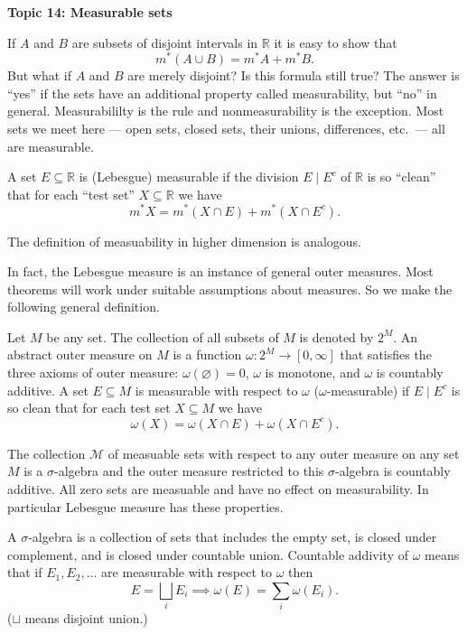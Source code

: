 \documentclass[11pt]{article}
\begin{document}
\begin{center}
  \textbf{Topic 14: Measurable sets}
\end{center}

If $A$ and $B$ are subsets of disjoint intervals in $\mathbb{R}$ it is easy to show that
\[
  m^*(A\cup B) = m^*A + m^*B.
\]
But what if $A$ and $B$ are merely disjoint?  Is this formula still true?  The answer is ``yes'' if the sets have an additional property called measurability, but ``no'' in general.  Measurabililty is the rule and nonmeasurability is the exception.  Most sets we meet here --- open sets, closed sets, their unions, differences, etc.\ --- all are measurable.

\begin{defn}
  A set $E \subseteq \mathbb{R}$ is \textsf{(Lebesgue) measurable} if the division $E \mid E^c$ of $\mathbb{R}$ is so ``clean'' that for each ``test set'' $X \subseteq \mathbb{R}$ we have
  \[
    m^*X = m^*(X \cap E) + m^*(X \cap E^c).
  \]

  The definition of measuability in higher dimension is analogous.
\end{defn}

In fact, the Lebesgue measure is an instance of general outer measures.  Most theorems will work under suitable assumptions about measures.  So we make the following general definition.

\begin{defn}
  Let $M$ be any set.  The collection of all subsets of $M$ is denoted by $2^M$.  An \textsf{abstract outer measure} on $M$ is a function $\omega : 2^M \to [0,\infty]$ that satisfies the three axioms of outer measure: $\omega(\varnothing) = 0$, $\omega$ is monotone, and $\omega$ is countably additive.  A set $E \subseteq M$ is \textsf{measurable} with respect to $\omega$ ($\omega$-measurable) if $E \mid E^c$ is so clean that for each test set $X \subseteq M$ we have
  \[
    \omega(X) = \omega(X \cap E) + \omega(X \cap E^c).
  \]
\end{defn}

\begin{thm}
  The collection $\mathcal{M}$ of measuable sets with respect to any outer measure on any set $M$ is a $\sigma$-algebra and the outer measure restricted to this $\sigma$-algebra is countably additive.  All zero sets are measuable and have no effect on measurability.  In particular Lebesgue measure has these properties.
\end{thm}

A \textsf{$\sigma$-algebra} is a collection of sets that includes the empty set, is closed under complement, and is closed under countable union.  \textsf{Countable addivity} of $\omega$ means that if $E_1, E_2, \dots$ are measurable with respect to $\omega$ then
\[
  E = \bigsqcup_i E_i \implies \omega(E) = \sum_i \omega(E_i).
\]
($\sqcup$ means disjoint union.)
\end{document}
